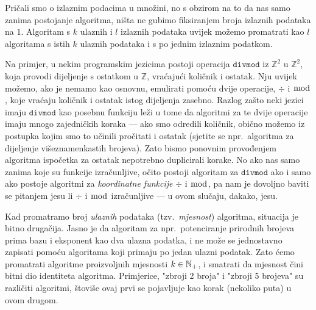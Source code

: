 
\begin{napomena}[{name=[samo jedan izlazni podatak]}]\label{nap:brip}
Pričali smo o izlaznim podacima u množini, no s obzirom na to da nas samo zanima postojanje algoritma, ništa ne gubimo fiksiranjem broja izlaznih podataka na $1$. Algoritam s $k$ ulaznih i $l$ izlaznih podataka uvijek možemo promatrati kao $l$ algoritama s istih $k$ ulaznih podataka i s po jednim izlaznim podatkom.

    Na primjer, u nekim programskim jezicima postoji operacija $\texttt{divmod}$ iz $\mathbb Z^2$ u $\mathbb Z^2$, koja provodi dijeljenje s ostatkom u $\mathbb Z$, vraćajući količnik i ostatak. Nju uvijek možemo, ako je nemamo kao osnovnu, emulirati pomoću dvije operacije, $\div$ i $\bmod$, koje vraćaju količnik i ostatak istog dijeljenja zasebno. Razlog zašto neki jezici imaju $\texttt{divmod}$ kao posebnu funkciju leži u tome da algoritmi za te dvije operacije imaju mnogo zajedničkih koraka --- ako smo odredili količnik, obično možemo iz postupka kojim smo to učinili pročitati i ostatak (sjetite se npr.\ algoritma za dijeljenje višeznamenkastih brojeva). Zato bismo ponovnim provođenjem algoritma ispočetka za ostatak nepotrebno duplicirali korake. No ako nas samo zanima koje su funkcije izračunljive, očito postoji algoritam za $\texttt{divmod}$ ako i samo ako postoje algoritmi za \emph{koordinatne funkcije} $\div$ i $\bmod$, pa nam je dovoljno baviti se pitanjem jesu li $\div$ i $\bmod$ izračunljive --- u ovom slučaju, dakako, jesu.
\end{napomena}

Kad promatramo broj \emph{ulaznih} podataka (tzv.\ \emph{mjesnost}) algoritma, situacija je bitno drugačija. Jasno je da algoritam za npr.\ potenciranje prirodnih brojeva prima bazu i eksponent kao dva ulazna podatka, i ne može se jednostavno zapisati pomoću algoritama koji primaju po jedan ulazni podatak. %
Zato ćemo promatrati algoritme proizvoljnih mjesnosti $k\in{\mathbb N}_+$, i smatrati da mjesnost čini bitni dio identiteta algoritma. Primjerice, "zbroji 2 broja" i "zbroji 5 brojeva" su različiti algoritmi, štoviše ovaj prvi se pojavljuje kao korak (nekoliko puta) u ovom drugom.

